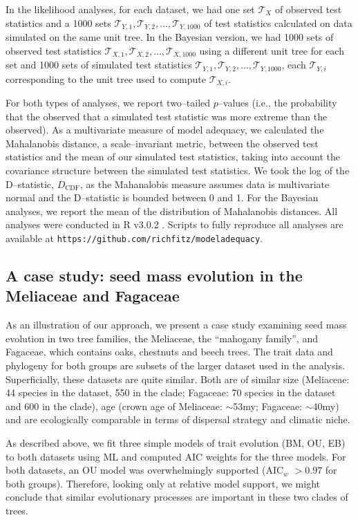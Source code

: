 \documentclass[a4paper,11pt]{article}
\begin{document}
In the likelihood analyses, for each dataset, we had one set $\mathcal{T}_X$ of observed test statistics and a 1000 sets $\mathcal{T}_{Y,1}, \mathcal{T}_{Y,2}, \ldots, \mathcal{T}_{Y,1000}$ of test statistics calculated on data simulated on the same unit tree. In the Bayesian version, we had 1000 sets of observed test statistics $\mathcal{T}_{X,1}, \mathcal{T}_{X,2}, \ldots, \mathcal{T}_{X,1000}$ using a different unit tree for each set and 1000 sets of simulated test statistics $\mathcal{T}_{Y,1}, \mathcal{T}_{Y,2}, \ldots, \mathcal{T}_{Y,1000}$, each $\mathcal{T}_{Y,i}$ corresponding to the unit tree used to compute $\mathcal{T}_{X,i}$.
 
For both types of analyses, we report two--tailed $p$--values (i.e., the probability that the observed that a simulated test statistic was more extreme than the observed). As a multivariate measure of model adequacy, we calculated the Mahalanobis distance, a scale--invariant metric, between the observed test statistics and the mean of our simulated test statistics, taking into account the covariance structure between the simulated test statistics. We took the log of the  D--statistic, $D_{\text{CDF}}$, as the Mahanalobis measure assumes data is multivariate normal and the D--statistic is bounded between 0 and 1. For the Bayesian analyses, we report the mean of the distribution of Mahalanobis distances. All analyses were conducted in R v3.0.2 \citep{R}. Scripts to fully reproduce all analyses are available at \texttt{https://github.com/richfitz/modeladequacy}.
  
\subsection{A case study: seed mass evolution in the Meliaceae and Fagaceae }
As an illustration of our approach, we present a case study examining seed mass evolution in two tree families, the Meliaceae, the ``mahogany family'', and Fagaceae, which contains oaks, chestnuts and beech trees. The trait data and phylogeny for both groups are subsets of the larger dataset used in the analysis. Superficially, these datasets are quite similar. Both are of similar size (Meliaceae: 44 species in the dataset, 550 in the clade; Fagaceae: 70 species in the dataset and 600 in the clade), age (crown age of Meliaceae: $\sim$53my; Fagaceae: $\sim$40my) and are ecologically comparable in terms of dispersal strategy and climatic niche. 

As described above, we fit three simple models of trait evolution (BM, OU, EB) to both datasets using ML and computed AIC weights \citep[AIC$_w$;][]{Akaike1974, aicweight} for the three models. For both datasets, an OU model was overwhelmingly supported (AIC$_w$ $>0.97$ for both groups). Therefore, looking only at relative model support, we might conclude that similar evolutionary processes are important in these two clades of trees.
\end{document}
